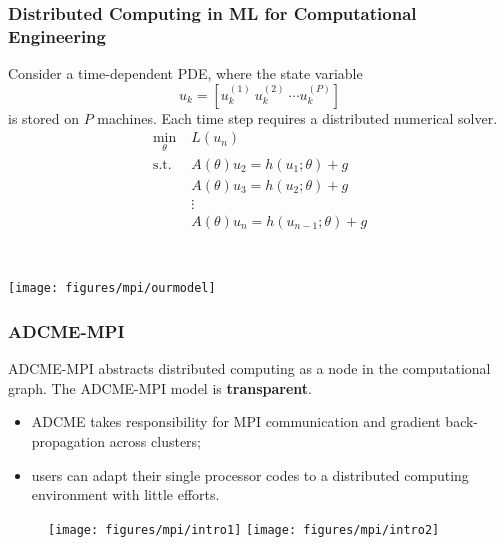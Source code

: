 \documentclass[usenames,dvipsnames]{beamer}
\begin{document}
\begin{frame}
\frametitle{Distributed Computing in ML for Computational Engineering}
\begin{minipage}{.5\textwidth}
	Consider a time-dependent PDE, where the state variable 
	$$u_k = [u_k^{(1)}\ u_k^{(2)}\ \cdots u_k^{(P)}]$$
	is stored on $P$ machines. Each time step requires a distributed numerical solver. 
	\begin{equation*}
\begin{aligned}
\min_{\theta} &\; L(u_n)\\ 
\text{s.t.} &\; A(\theta)u_2 = h(u_1; \theta) + g\\ 
&\; A(\theta)u_3 = h(u_2; \theta) + g\\
&\;\vdots \\ 
&\; A(\theta)u_n = h(u_{n-1}; \theta) + g
\end{aligned}
	\end{equation*}
\end{minipage}~
\begin{minipage}{.5\textwidth}
	\texttt{[image: figures/mpi/ourmodel]}
\end{minipage}
\end{frame}


\begin{frame}
\frametitle{ADCME-MPI}

ADCME-MPI abstracts distributed computing as a node in the computational graph. The ADCME-MPI model is \textbf{transparent}.
\begin{itemize}
\item ADCME takes responsibility for MPI communication and gradient back-propagation across clusters;
\item users can adapt their single processor codes to a distributed computing environment with little efforts.
\end{itemize}
 


\begin{figure}
	\centering 
	\texttt{[image: figures/mpi/intro1]}
	\texttt{[image: figures/mpi/intro2]}
\end{figure}


\end{frame}
\end{document}
